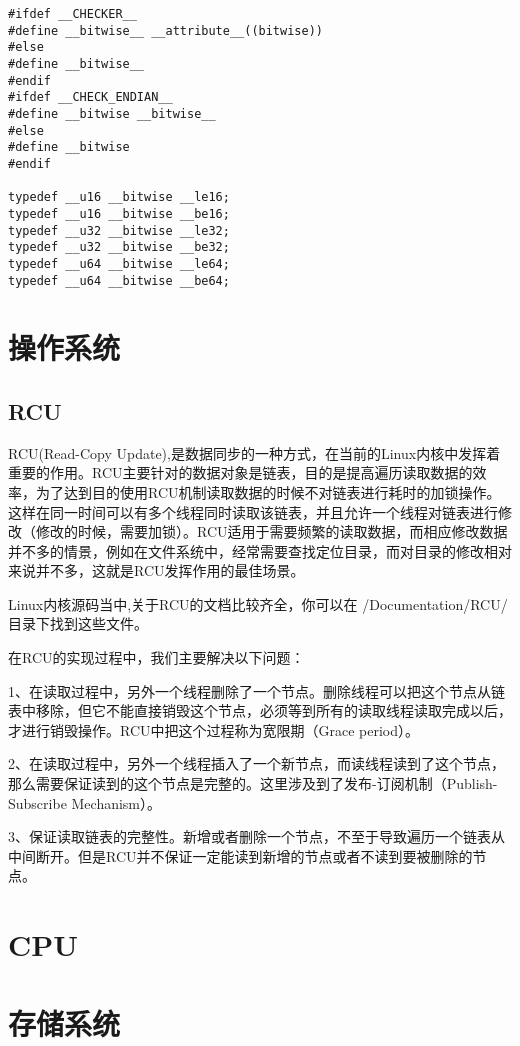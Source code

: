 \begin{verbatim}
#ifdef __CHECKER__
#define __bitwise__ __attribute__((bitwise))
#else
#define __bitwise__
#endif
#ifdef __CHECK_ENDIAN__
#define __bitwise __bitwise__
#else
#define __bitwise
#endif

typedef __u16 __bitwise __le16;
typedef __u16 __bitwise __be16;
typedef __u32 __bitwise __le32;
typedef __u32 __bitwise __be32;
typedef __u64 __bitwise __le64;
typedef __u64 __bitwise __be64;
\end{verbatim}
		
	\section{操作系统}
		\subsection{RCU}
			RCU(Read-Copy Update),是数据同步的一种方式，在当前的Linux内核中发挥着重要的作用。RCU主要针对的数据对象是链表，目的是提高遍历读取数据的效率，为了达到目的使用RCU机制读取数据的时候不对链表进行耗时的加锁操作。这样在同一时间可以有多个线程同时读取该链表，并且允许一个线程对链表进行修改（修改的时候，需要加锁）。RCU适用于需要频繁的读取数据，而相应修改数据并不多的情景，例如在文件系统中，经常需要查找定位目录，而对目录的修改相对来说并不多，这就是RCU发挥作用的最佳场景。

			Linux内核源码当中,关于RCU的文档比较齐全，你可以在 /Documentation/RCU/ 目录下找到这些文件。

			在RCU的实现过程中，我们主要解决以下问题：

       			1、在读取过程中，另外一个线程删除了一个节点。删除线程可以把这个节点从链表中移除，但它不能直接销毁这个节点，必须等到所有的读取线程读取完成以后，才进行销毁操作。RCU中把这个过程称为宽限期（Grace period）。

       			2、在读取过程中，另外一个线程插入了一个新节点，而读线程读到了这个节点，那么需要保证读到的这个节点是完整的。这里涉及到了发布-订阅机制（Publish-Subscribe Mechanism）。

       			3、保证读取链表的完整性。新增或者删除一个节点，不至于导致遍历一个链表从中间断开。但是RCU并不保证一定能读到新增的节点或者不读到要被删除的节点。
	\section{CPU}
		
	\section{存储系统}
